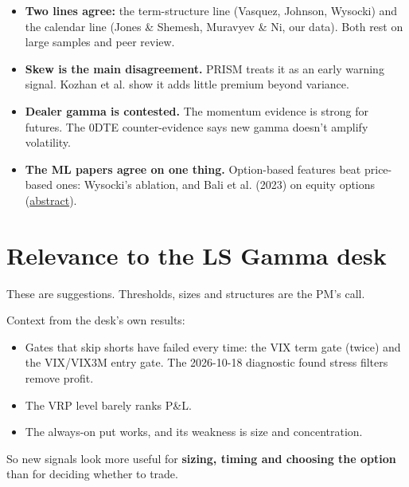 \documentclass{article}
\begin{document}
\begin{itemize}

\item \textbf{Two lines agree:} the term-structure line (Vasquez, Johnson, Wysocki) and the calendar line (Jones \& Shemesh, Muravyev \& Ni, our data). Both rest on large samples and peer review.

\item \textbf{Skew is the main disagreement.} PRISM treats it as an early warning signal. Kozhan et al. show it adds little premium beyond variance.

\item \textbf{Dealer gamma is contested.} The momentum evidence is strong for futures. The 0DTE counter-evidence says new gamma doesn't amplify volatility.

\item \textbf{The ML papers agree on one thing.} Option-based features beat price-based ones: Wysocki's ablation, and Bali et al. (2023) on equity options (\href{https://econpapers.repec.org/RePEc:oup:rfinst:v:36:y:2023:i:9:p:3548-3602.}{abstract}).

\end{itemize}

\section{Relevance to the LS Gamma desk}

These are suggestions. Thresholds, sizes and structures are the PM's call.

Context from the desk's own results:

\begin{itemize}

\item Gates that skip shorts have failed every time: the VIX term gate (twice) and the VIX/\allowbreak{}VIX3M entry gate. The 2026-10-18 diagnostic found stress filters remove profit.

\item The VRP level barely ranks P\&L.

\item The always-on put works, and its weakness is size and concentration.

\end{itemize}

So new signals look more useful for \textbf{sizing, timing and choosing the option} than for deciding whether to trade.
\end{document}
